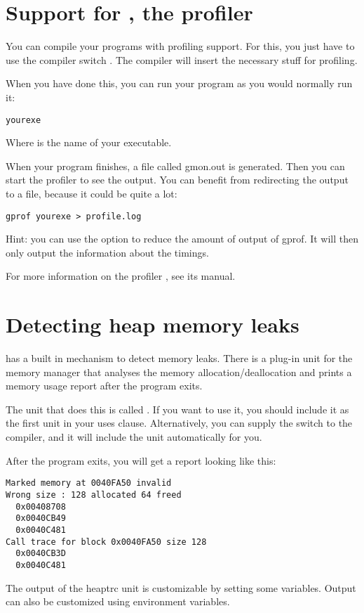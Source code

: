 \section{Support for , the \gnu profiler}
\label{se:gprof}

You can compile your programs with profiling support. For this, you just
have to use the compiler switch . The compiler will insert the
necessary stuff for profiling.

When you have done this, you can run your program as you would normally 
run it:
\begin{verbatim}
yourexe
\end{verbatim}
Where  is the name of your executable.

When your program finishes, a file called gmon.out is generated. Then you can start
the profiler to see the output. You can benefit from redirecting the output to a file,
because it could be quite a lot:
\begin{verbatim}
gprof yourexe > profile.log
\end{verbatim}

Hint: you can use the  option to reduce the amount of output of gprof. It will
then only output the information about the timings.

For more information on the \gnu profiler , see its manual.

\section{Detecting heap memory leaks}
\label{se:heaptrc}
\fpc has a built in mechanism to detect memory leaks. There is a plug-in
unit for the memory manager that analyses the memory allocation/deallocation
and prints a memory usage report after the program exits.

The unit that does this is called . If you want to use it,
you should include it as the first unit in your uses clause. Alternatively,
you can supply the  switch to the compiler, and it will include
the unit automatically for you.

After the program exits, you will get a report looking like this:
\begin{verbatim}
Marked memory at 0040FA50 invalid
Wrong size : 128 allocated 64 freed
  0x00408708
  0x0040CB49
  0x0040C481
Call trace for block 0x0040FA50 size 128
  0x0040CB3D
  0x0040C481
\end{verbatim}
The output of the heaptrc unit is customizable by setting some variables.
Output can also be customized using environment variables.

